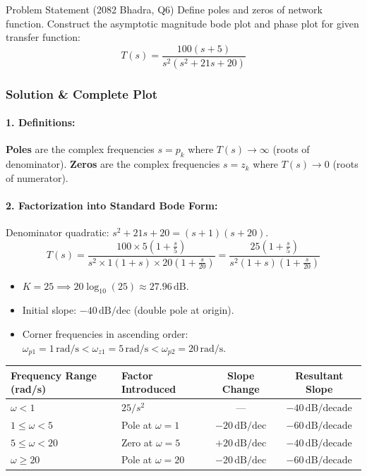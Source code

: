 \documentclass[11pt,a4paper,oneside]{article}
\begin{document}
\begin{questionbox}{Problem Statement (2082 Bhadra, Q6)}
Define poles and zeros of network function. Construct the asymptotic magnitude bode plot and phase plot for given transfer function:
\[
T(s) = \frac{100(s + 5)}{s^2(s^2 + 21s + 20)}
\]
\end{questionbox}

\subsubsection*{Solution \& Complete Plot}
\paragraph{1. Definitions:}
\textbf{Poles} are the complex frequencies $s=p_k$ where $T(s) \to \infty$ (roots of denominator). \textbf{Zeros} are the complex frequencies $s=z_k$ where $T(s) \to 0$ (roots of numerator).

\paragraph{2. Factorization into Standard Bode Form:}
Denominator quadratic: $s^2 + 21s + 20 = (s+1)(s+20)$.
\[
T(s) = \frac{100 \times 5\left(1 + \frac{s}{5}\right)}{s^2 \times 1(1+s) \times 20\left(1 + \frac{s}{20}\right)} = \frac{25\left(1 + \frac{s}{5}\right)}{s^2(1+s)\left(1 + \frac{s}{20}\right)}
\]
\begin{itemize}[leftmargin=1.5em]
  \item $K = 25 \implies 20\log_{10}(25) \approx 27.96\,\mathrm{dB}$.
  \item Initial slope: $-40\,\mathrm{dB/dec}$ (double pole at origin).
  \item Corner frequencies in ascending order: $\omega_{p1} = 1\,\mathrm{rad/s} < \omega_{z1} = 5\,\mathrm{rad/s} < \omega_{p2} = 20\,\mathrm{rad/s}$.
\end{itemize}

\begin{center}
\small
\begin{tabular}{@{}llcc@{}}
\toprule
\textbf{Frequency Range (rad/s)} & \textbf{Factor Introduced} & \textbf{Slope Change} & \textbf{Resultant Slope} \\
\midrule
$\omega < 1$ & $25/s^2$ & --- & $-40\,\mathrm{dB/decade}$ \\
$1 \le \omega < 5$ & Pole at $\omega = 1$ & $-20\,\mathrm{dB/dec}$ & $-60\,\mathrm{dB/decade}$ \\
$5 \le \omega < 20$ & Zero at $\omega = 5$ & $+20\,\mathrm{dB/dec}$ & $-40\,\mathrm{dB/decade}$ \\
$\omega \ge 20$ & Pole at $\omega = 20$ & $-20\,\mathrm{dB/dec}$ & $-60\,\mathrm{dB/decade}$ \\
\bottomrule
\end{tabular}
\end{center}
\end{document}
